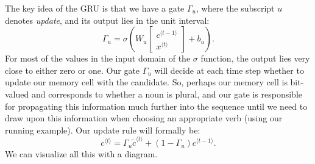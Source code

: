 \documentclass[12pt]{article}
\begin{document}
The key idea of the GRU is that we have a gate $\Gamma_u$, where the subscript $u$ denotes \emph{update}, and its output lies in the unit interval:
\[
\Gamma_u = \sigma \left( W_u \begin{bmatrix} c^{\langle t-1 \rangle} \\ x^{\langle t \rangle} \end{bmatrix} + b_u\right).
\]
For most of the values in the input domain of the $\sigma$ function, the output lies very close to either zero or one. Our gate $\Gamma_u$ will decide at each time step whether to update our memory cell with the candidate. So, perhaps our memory cell is bit-valued and corresponds to whether a noun is plural, and our gate is responsible for propagating this information much further into the sequence until we need to draw upon this information when choosing an appropriate verb (using our running example). Our update rule will formally be:
\begin{equation}
  \label{eq: gammaupdategru}
c^{\langle t \rangle} = \Gamma_u \tilde c^{\langle t \rangle} + \left(1-\Gamma_u\right) c^{\langle t-1\rangle}.
\end{equation}
We can visualize all this with a diagram.
\end{document}

